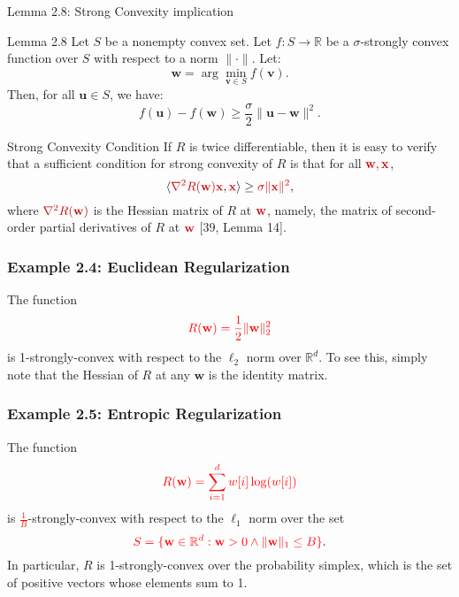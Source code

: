\documentclass[handout]{beamer}
\newcommand{\redmath}[1]{\textcolor{mathred}{#1}}
\begin{document}
\begin{small}
\begin{frame}{Lemma 2.8: Strong Convexity implication}
    \begin{block}{Lemma 2.8}
        Let \( S \) be a nonempty convex set. Let \( f: S \to \mathbb{R} \) be a \( \sigma \)-strongly convex function over \( S \) with respect to a norm \( \|\cdot\| \). Let:
        \[
        \mathbf{w} = \arg\min_{\mathbf{v} \in S} f(\mathbf{v}).
        \]
        Then, for all \( \mathbf{u} \in S \), we have:
        \begin{equation*}
            f(\mathbf{u}) - f(\mathbf{w}) \geq \frac{\sigma}{2} \|\mathbf{u} - \mathbf{w}\|^2.
          \end{equation*}
    \end{block}
\end{frame}

\begin{frame}{Strong Convexity Condition}
    If \( R \) is twice differentiable, then it is easy to verify that a sufficient condition for strong convexity of \( R \) is that for all \( \redmath{\mathbf{w}, \mathbf{x}} \),
    \[
    \langle \redmath{\nabla^2 R(\mathbf{w}) \mathbf{x}}, \redmath{\mathbf{x}} \rangle \geq \redmath{\sigma \|\mathbf{x}\|^2},
    \]
    where \( \redmath{\nabla^2 R(\mathbf{w})} \) is the Hessian matrix of \( R \) at \( \redmath{\mathbf{w}} \), namely, the matrix of second-order partial derivatives of \( R \) at \( \redmath{\mathbf{w}} \) [39, Lemma 14].
\end{frame}


\begin{frame}
    \frametitle{Example 2.4: Euclidean Regularization}
    The function 
    \[
    \textcolor{red}{R(\mathbf{w}) = \frac{1}{2} \|\mathbf{w}\|_2^2}
    \]
    is 1-strongly-convex with respect to the $\ell_2$ norm over $\mathbb{R}^d$. To see this, simply note that the Hessian of $R$ at any $\mathbf{w}$ is the identity matrix.
\end{frame}

\begin{frame}
    \frametitle{Example 2.5: Entropic Regularization}
    The function 
    \[
    \textcolor{red}{R(\mathbf{w}) = \sum_{i=1}^{d} w[i] \log(w[i])}
    \]
    is \textcolor{red}{$\frac{1}{B}$}-strongly-convex with respect to the $\ell_1$ norm over the set 
    \[
    \textcolor{red}{S = \{\mathbf{w} \in \mathbb{R}^d : \mathbf{w} > 0 \wedge \|\mathbf{w}\|_1 \leq B\}}.
    \]
    In particular, $R$ is 1-strongly-convex over the probability simplex, which is the set of positive vectors whose elements sum to 1.
\end{frame}


\end{small}
\end{document}
